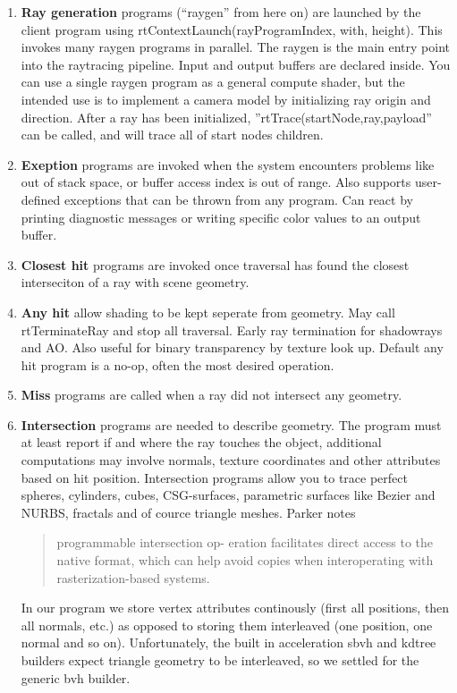 \begin{enumerate}
	\item {
	\textbf{Ray generation}
	              programs (``raygen'' from here on) are launched by the client program using rtContextLaunch(rayProgramIndex, with,                       height). This invokes many raygen programs in parallel. The raygen is the main entry point into the raytracing pipeline.                 Input and output buffers are declared inside. You can use a single raygen program as a general compute shader, but the                   intended use is to implement a camera model by initializing ray origin and direction. After a ray has been initialized,                  ''rtTrace(startNode,ray,payload'' can be
	              called, and will trace all of start nodes children. 
	      }

	\item{\textbf{Exeption} programs are invoked when the system encounters problems like out of stack space, or buffer access index is                   out of range. Also supports user-defined exceptions that can be 	thrown from any program. Can react by printing                         diagnostic messages or   writing specific color values to an output buffer.}

	\item{\textbf{Closest hit} programs are invoked once traversal has found the closest interseciton of a ray with scene geometry.}

	\item{\textbf{Any hit}
								allow shading to be kept seperate from geometry.
								May call rtTerminateRay and stop all traversal. Early ray termination for shadowrays and AO.
								Also useful for binary transparency by texture look up.
								Default any hit program is a no-op, often the most desired operation.}

	\item{\textbf{Miss}
								programs are called when a ray did not intersect any geometry.}

	\item {\textbf{Intersection}
                programs are needed to describe geometry. The program must at least report if and where the ray touches the object, 
                additional computations may involve normals, texture coordinates and other attributes based on hit position.
								Intersection programs allow you to trace perfect spheres, cylinders, cubes,  CSG-surfaces, parametric surfaces like
								Bezier and NURBS, fractals and of cource triangle meshes. Parker \cite{Parker10OptiX} notes \begin{quote} programmable intersection op-
eration facilitates direct access to the native format, which can help
avoid copies when interoperating with rasterization-based systems.\end{quote} In our program we store vertex attributes continously (first all positions, then all normals, etc.) as opposed to storing them interleaved (one position, one normal and so on). Unfortunately, the built in acceleration sbvh and kdtree builders expect triangle geometry to be interleaved, so we settled for the generic bvh builder.}
	

\end{enumerate}
